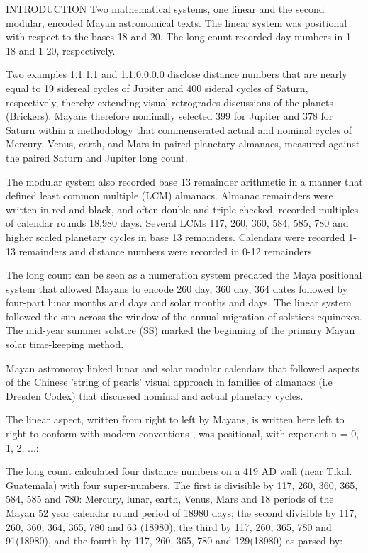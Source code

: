 \documentclass[12pt]{article}
\begin{document}
INTRODUCTION Two mathematical systems, one linear and the second modular, encoded Mayan astronomical texts. The linear system was positional with respect to the  bases 18 and 20. The long count recorded day numbers in 1-18 and 1-20, respectively.  

Two examples 1.1.1.1 and 1.1.0.0.0.0 disclose distance numbers that are nearly equal to 19 sidereal cycles of Jupiter and 400 sideral cycles of Saturn, respectively, thereby extending visual retrogrades discussions of the planets (Brickers).  Mayans therefore nominally selected 399 for Jupiter and 378 for Saturn within a methodology that commenserated actual and nominal cycles of Mercury, Venus, earth, and Mars in paired planetary almanacs, measured against the paired Saturn and Jupiter long count.

The modular system also recorded base 13 remainder arithmetic in a manner that defined  least common multiple (LCM) almanacs. Almanac remainders were written in red and black, and often double and triple checked, recorded multiples of calendar rounds 18,980 days. Several LCMs 117, 260, 360, 584, 585, 780 and higher scaled planetary cycles in base  13 remainders. Calendars were recorded 1-13 remainders and distance numbers were recorded in 0-12 remainders.  

The long count can be seen as a numeration system predated the Maya positional system that allowed Mayans to encode 260 day, 360 day, 364 dates followed by four-part lunar months and days and solar months and days. The linear system followed the sun across the window of the annual migration of solstices equinoxes. The mid-year summer solstice (SS) marked the beginning of the primary Mayan solar time-keeping method.

Mayan astronomy linked lunar and solar modular calendars that followed aspects of the Chinese 'string of pearls' visual approach in families of almanacs (i.e Dresden Codex) that discussed nominal and actual planetary cycles.    

The linear aspect, written from right to left by Mayans, is written here left to right to conform with modern conventions , was positional, with exponent n = 0, 1, 2, ...:  

The long count calculated four distance numbers on a 419 AD wall (near Tikal. Guatemala) with four super-numbers. The first is divisible by 117, 260, 360, 365, 584, 585 and 780: Mercury, lunar, earth, Venus, Mars and 18 periods of the Mayan 52 year calendar round period of 18980 days; the second divisible by 117, 260, 360, 364, 365, 780 and 63 (18980); the third by  117, 260, 365, 780 and 91(18980), and the fourth by 117, 260, 365, 780 and 129(18980) as parsed by:
\end{document}
